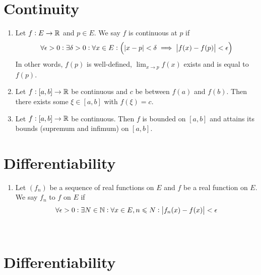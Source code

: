 \documentclass{styles/note}
\begin{document}
\newpage
\section{Continuity}
  
  \begin{enumerate}[label=(\alph*)]
    \item Let $f : E \to \mathbb{R}$ and $p \in E$. We say $f$ is continuous at $p$ if
     \[ \forall \epsilon > 0 : \exists \delta > 0 : \forall x \in E : \left( \abs{x - p} < \delta \implies \abs{f(x) - f(p)} < \epsilon \right) \]
     In other words, $f(p)$ is well-defined, $\lim_{x \to p} f(x)$ exists and is equal to $f(p)$.
    
    \item {}
      Let $f : [a, b] \to \mathbb{R}$ be continuous and $c$ be between $f(a)$ and $f(b)$. Then there exists some $\xi \in [a, b]$ with $f(\xi) = c$.
    
    \item Let $f : [a, b] \to \mathbb{R}$ be continuous. Then $f$ is bounded on $[a, b]$ and attains its bounds (supremum and infimum) on $[a, b]$.
  \end{enumerate}


\section{Differentiability}

  \begin{enumerate}[label=(\alph*)]
    \item Let $(f_n)$ be a sequence of real functions on $E$ and $f$ be a real function on $E$. We say $f_n$  to $f$ on $E$ if
      \[ \forall \epsilon > 0 : \exists N \in \mathbb{N} : \forall x \in E, n \leqslant N : \abs{f_n(x) - f(x)} < \epsilon \]
    
    \
  \end{enumerate}


\newpage
\section{Differentiability}
\end{document}
